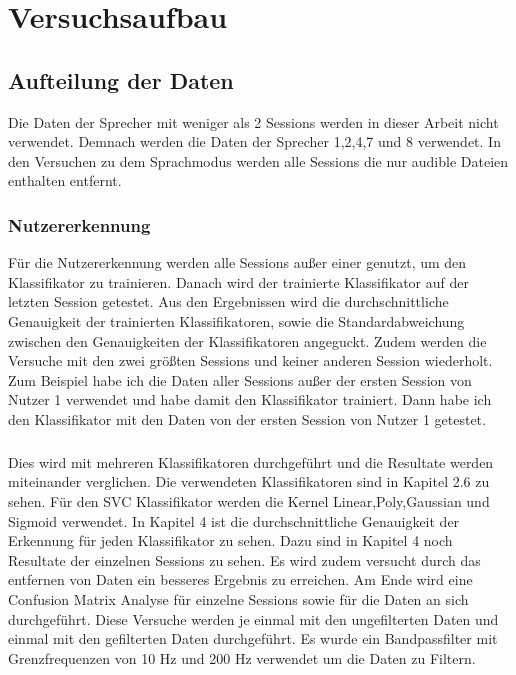\chapter{Versuchsaufbau}
\section{Aufteilung der Daten}
Die Daten der Sprecher mit weniger als 2 Sessions werden in dieser Arbeit nicht verwendet. Demnach werden die Daten der Sprecher 1,2,4,7 und 8 verwendet. In den Versuchen zu dem Sprachmodus werden alle Sessions die nur audible Dateien enthalten entfernt.

\subsection{Nutzererkennung}
Für die Nutzererkennung werden alle Sessions außer einer genutzt, um den Klassifikator zu trainieren. Danach wird der trainierte Klassifikator auf der letzten Session getestet.
Aus den Ergebnissen wird die durchschnittliche Genauigkeit der trainierten Klassifikatoren, sowie die Standardabweichung zwischen den Genauigkeiten der Klassifikatoren angeguckt. Zudem werden die Versuche mit den zwei größten Sessions und keiner anderen Session wiederholt.
Zum Beispiel habe ich die Daten aller Sessions außer der ersten Session von Nutzer 1 verwendet und habe damit den Klassifikator trainiert. Dann habe ich den Klassifikator mit den Daten von der ersten Session von Nutzer 1 getestet.
\paragraph{}
Dies wird mit mehreren Klassifikatoren durchgeführt und die Resultate werden miteinander verglichen. Die verwendeten Klassifikatoren sind in Kapitel 2.6 zu sehen. Für den SVC Klassifikator werden die Kernel Linear,Poly,Gaussian und Sigmoid verwendet.
In Kapitel 4 ist die durchschnittliche Genauigkeit der Erkennung für jeden Klassifikator zu sehen. Dazu sind in Kapitel 4 noch Resultate der einzelnen Sessions zu sehen. Es wird zudem versucht durch das entfernen von Daten ein besseres Ergebnis zu erreichen. Am Ende wird eine Confusion Matrix Analyse für einzelne Sessions sowie für die Daten an sich durchgeführt.
Diese Versuche werden je einmal mit den ungefilterten Daten und einmal mit den gefilterten Daten durchgeführt. Es wurde ein Bandpassfilter mit Grenzfrequenzen von 10 Hz und 200 Hz verwendet um die Daten zu Filtern.
\clearpage

